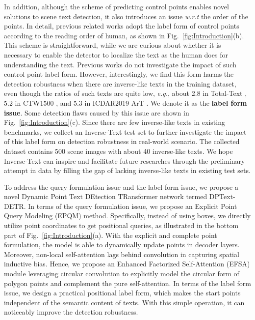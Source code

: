 \documentclass[letterpaper]{article} \usepackage{aaai23}  \usepackage{times}  \usepackage{helvet}  \usepackage{courier}  \usepackage[hyphens]{url}  \usepackage{graphicx} \urlstyle{rm}
\begin{document}
In addition, although the scheme of predicting control points enables novel solutions to scene text detection, it also introduces an issue \emph{w.r.t} the order of the points. 
In detail, previous related works adopt the label form of control points according to the reading order of human, as shown in Fig.~\ref{fig:Introduction}(b). This scheme is straightforward, while we are curious about whether it is necessary to enable the detector to localize the text as the human does for understanding the text. Previous works do not investigate the impact of such control point label form. However, interestingly, we find this form harms the detection robustness when there are inverse-like texts in the training dataset, even though the ratios of such texts are quite low, \emph{e.g.}, about 2.8 in Total-Text \cite{ch2020total}, 5.2 in CTW1500 \cite{liu2019curved}, and 5.3 in ICDAR2019 ArT \cite{chng2019icdar2019}.  We denote it as the \textbf{label form issue}.
Some detection flaws caused by this issue are shown in Fig.~\ref{fig:Introduction}(c). 
Since there are few inverse-like texts in existing benchmarks, we collect an Inverse-Text test set to further investigate the impact of this label form on detection robustness in real-world scenario. The collected dataset contains 500 scene images with about 40 inverse-like texts. We hope Inverse-Text can inspire and facilitate future researches through the preliminary attempt in data by filling the gap of lacking inverse-like texts in existing test sets.

To address the query formulation issue and the label form issue, we propose a novel Dynamic Point Text DEtection TRansformer network termed DPText-DETR. In terms of the query formulation issue, we propose an Explicit Point Query Modeling (EPQM) method. Specifically, instead of using boxes, we directly utilize point coordinates to get positional queries, as illustrated in the bottom part of Fig.~\ref{fig:Introduction}(a). With the explicit and complete point formulation, the model is able to dynamically update points in decoder layers. 
Moreover, non-local self-attention lags behind convolution in capturing spatial inductive bias. Hence, we propose an Enhanced Factorized Self-Attention (EFSA) module leveraging circular convolution \cite{peng2020deep} to explicitly model the circular form of polygon points and complement the pure self-attention.
In terms of the label form issue, we design a practical positional label form, which makes the start points independent of the semantic content of texts. With this simple operation, it can noticeably improve the detection robustness.
\end{document}
